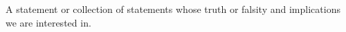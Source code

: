 A statement or collection of statements whose truth or falsity and implications
we are interested in.